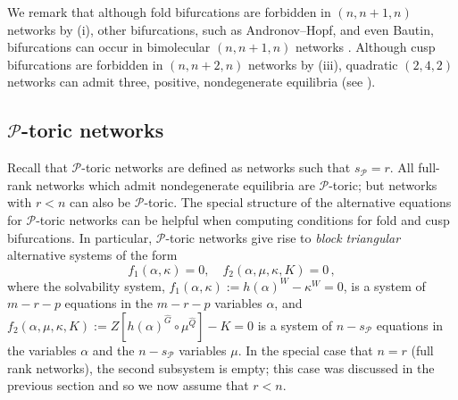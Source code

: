 \documentclass[11pt]{amsart}
\renewcommand{\k}{\kappa}
\newcommand{\wQ}{\widehat{Q}}
\newcommand{\wG}{\widehat{G}}
\newcommand{\mP}{\mathcal{P}}
\theoremstyle{definition}
\begin{document}
We remark that although fold bifurcations are forbidden in $(n,n+1,n)$ networks by (i), other bifurcations, such as Andronov--Hopf, and even Bautin, bifurcations can occur in bimolecular $(n,n+1,n)$ networks \cite{banajiborosnonlinearity}. Although cusp bifurcations are forbidden in $(n,n+2,n)$ networks by (iii), quadratic $(2,4,2)$ networks can admit three, positive, nondegenerate equilibria (see \cite[Remark~38]{BBH2024smallbif}).

\subsection{$\mP$-toric networks}
Recall that $\mP$-toric networks are defined as networks such that $s_{\mP} = r$. All full-rank networks which admit nondegenerate equilibria are $\mP$-toric; but networks with $r < n$ can also be $\mP$-toric. The special structure of the alternative equations for $\mP$-toric networks can be helpful when computing conditions for fold and cusp bifurcations. In particular, $\mP$-toric networks give rise to {\em block triangular} alternative systems of the form
\[
f_1(\alpha, \k) = 0, \quad f_2(\alpha, \mu, \k, K) = 0\,,
\]
where the solvability system, $f_1(\alpha, \k):=h(\alpha)^W-\k^W=0$, is a system of $m-r-p$ equations in the $m-r-p$ variables $\alpha$, and $f_2(\alpha, \mu, \k,K):=Z[h(\alpha)^{\wG}\circ \mu^{\wQ}]-K = 0$ is a system of $n-s_\mP$ equations in the variables $\alpha$ and the $n-s_\mP$ variables $\mu$. In the special case that $n=r$ (full rank networks), the second subsystem is empty; this case was discussed in the previous section and so we now assume that $r<n$.
\end{document}
